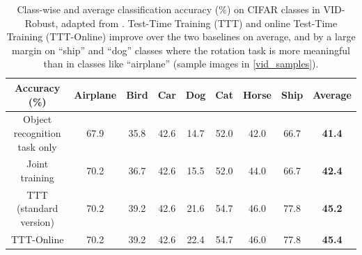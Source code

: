 \begin{table}[t!]
\begin{center}
{
\setlength\tabcolsep{4pt}
\begin{tabular}{c|ccccccc|c}
\toprule
Accuracy (\%)
		&Airplane	&Bird	&Car &Dog &Cat &Horse	&Ship  	&\textbf{Average}\\
\midrule
{\small Object recognition task only} & 67.9 & 35.8 & 42.6 & 14.7 & 52.0 & 42.0 & 66.7
&\textbf{41.4}\\
\midrule
{\small Joint training {\scriptsize \citep{hendrycks2019using}}} & 70.2 & 36.7 & 42.6 & 15.5 & 52.0 & 44.0 & 66.7
&\textbf{42.4}\\
\midrule
TTT (standard version) & 70.2 & 39.2 & 42.6 & 21.6 & 54.7 & 46.0 & 77.8
&\textbf{45.2}\\
\midrule 
TTT-Online & 70.2 & 39.2 & 42.6 & 22.4 & 54.7 & 46.0 & 77.8
&\textbf{45.4}\\
\bottomrule
\end{tabular}
}
\end{center}
\caption{
Class-wise and average classification accuracy (\%) on CIFAR classes in VID-Robust, adapted from \cite{shankar2019systematic}. Test-Time Training (TTT) and online Test-Time Training (TTT-Online) improve over the two baselines on average, and by a large margin on ``ship'' and ``dog'' classes where the rotation task is more meaningful than in classes like ``airplane'' (sample images in \autoref{vid_samples}). 
}
\label{table.cifar7}
\vspace{-1ex}
\end{table} 
